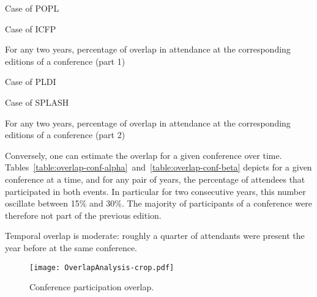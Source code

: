 \begin{table}
\centering
     \begin{subtable}[b]{0.4\textwidth}
       \centering
       \caption{Case of POPL}
     \end{subtable}
     \hfill
     \begin{subtable}[b]{0.4\textwidth}
       \centering
       \caption{Case of ICFP}
    \end{subtable}

     \caption{For any two years, percentage of overlap in attendance at the corresponding editions of a conference (part 1)}
     \label{table:overlap-conf-alpha}
\end{table}

\begin{table}
\centering
     \begin{subtable}[b]{0.4\textwidth}
       \centering
       \caption{Case of PLDI}
     \end{subtable}
     \begin{subtable}[b]{0.4\textwidth}
       \centering
       \caption{Case of SPLASH}
     \end{subtable}

     \caption{For any two years, percentage of overlap in attendance at the corresponding editions of a conference (part 2)}
     \label{table:overlap-conf-beta}
\end{table}

Conversely, one can estimate the overlap for a given conference over time.
Tables~\ref{table:overlap-conf-alpha}~and~\ref{table:overlap-conf-beta} depicts
for a given conference at a time, and for any pair of years, the percentage of
attendees that participated in both events. In particular for two consecutive
years, this number oscillate between 15\% and 30\%. The majority of
participants of a conference were therefore not part of the previous edition.

\begin{obs}
  Temporal overlap is moderate: roughly a quarter of attendants were present
  the year before at the same conference.
  \label{obs:overlap-temp}
\end{obs}

\begin{figure}
  \centering
  \texttt{[image: OverlapAnalysis-crop.pdf]}
  \caption{Conference participation overlap.}
  \label{fig:overlap}
\end{figure}

